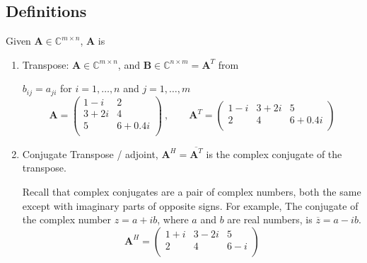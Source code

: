 \documentclass[12pt]{article}
\newcommand{\ve}[1]{\ensuremath{\mathbf{#1}}}
\newcommand{\cc}[1]{\ensuremath{\overline{#1}}}
\begin{document}
\subsection*{Definitions}

Given $\ve{A} \in \mathbb{C}^{m \times n}$, \ve{A} is
%
\begin{enumerate}
\item Transpose: $\ve{A} \in \mathbb{C}^{m \times n}$, and $\ve{B} \in \mathbb{C}^{n \times m} = \ve{A}^T$ from

$b_{ij} = a_{ji}$ for $i = 1, \dots, n$ and $j = 1, \dots, m$
%
\newcommand{\aaa}{1-i}
\newcommand{\aab}{2}
\newcommand{\aba}{3+2i}
\newcommand{\abb}{4}
\newcommand{\aca}{5}
\newcommand{\acb}{6+0.4i}
%
\begin{equation}
\ve{A} = \begin{pmatrix}
   \aaa & \aab \\
   \aba & \abb \\
   \aca & \acb \\
\end{pmatrix}\:, \qquad 
%
\ve{A}^T = \begin{pmatrix}
   \aaa & \aba & \aca \\
   \aab & \abb & \acb \\
\end{pmatrix} \nonumber
\end{equation}

\item Conjugate Transpose / adjoint, $\ve{A}^H = \cc{\ve{A}^T}$ is the complex conjugate of the transpose. 

Recall that complex conjugates are a pair of complex numbers, both the same except with imaginary parts of opposite signs. For example, The conjugate of the complex number $z=a+ib$, where $a$ and $b$ are real numbers, is $\overline{z} = a - ib$.
\renewcommand{\aaa}{1+i}
\renewcommand{\aba}{3-2i}
\renewcommand{\acb}{6-i}
%
\begin{equation}
\ve{A}^H = \begin{pmatrix}
   \aaa & \aba & \aca \\
   \aab & \abb & \acb \\
\end{pmatrix} \nonumber
\end{equation}


\end{enumerate}
\end{document}
